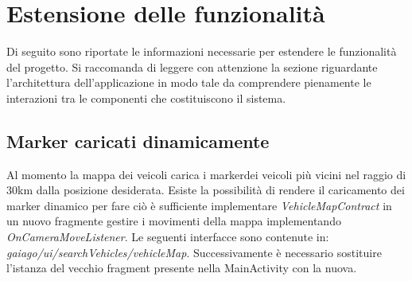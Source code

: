 \section{Estensione delle funzionalità}
Di seguito sono riportate le informazioni necessarie per estendere le funzionalità del progetto. Si raccomanda di leggere con attenzione la sezione riguardante l'architettura dell'applicazione in modo tale da comprendere pienamente le interazioni tra le componenti che costituiscono il sistema.
\subsection{Marker caricati dinamicamente}
Al momento la mappa dei veicoli carica i marker\glosp dei veicoli più vicini nel raggio di 30km dalla posizione desiderata. Esiste la possibilità di rendere il caricamento dei marker dinamico per fare ciò è sufficiente implementare \textit{VehicleMapContract} in un nuovo fragment\glosp e gestire i movimenti della mappa implementando \textit{OnCameraMoveListener}.
Le seguenti interfacce sono contenute in:
\textit{gaiago/ui/searchVehicles/vehicleMap}.
Successivamente è necessario sostituire l'istanza del vecchio fragment presente nella MainActivity con la nuova.